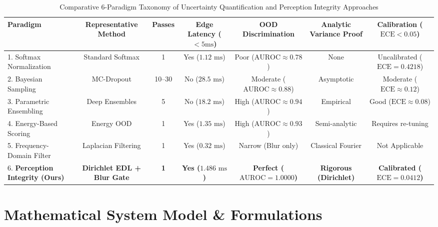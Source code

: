 \documentclass[conference]{IEEEtran}
\begin{document}
\begin{table}[t]
\centering
\caption{Comparative 6-Paradigm Taxonomy of Uncertainty Quantification and Perception Integrity Approaches}
\label{tab:taxonomy_uq}
\begin{tabular}{@{}lcccccc@{}}
\toprule
\textbf{Paradigm} & \textbf{Representative Method} & \textbf{Passes} & \textbf{Edge Latency ($<5\text{ms}$)} & \textbf{OOD Discrimination} & \textbf{Analytic Variance Proof} & \textbf{Calibration ($\text{ECE} < 0.05$)} \\ \midrule
1. Softmax Normalization & Standard Softmax \cite{hendrycks2016baseline} & 1 & Yes ($1.12\text{ ms}$) & Poor ($\text{AUROC} \approx 0.78$) & None & Uncalibrated ($\text{ECE} = 0.4218$) \\
2. Bayesian Sampling & MC-Dropout \cite{gal2016dropout} & 10--30 & No ($28.5\text{ ms}$) & Moderate ($\text{AUROC} \approx 0.88$) & Asymptotic & Moderate ($\text{ECE} \approx 0.12$) \\
3. Parametric Ensembling & Deep Ensembles \cite{lakshminarayanan2017simple} & 5 & No ($18.2\text{ ms}$) & High ($\text{AUROC} \approx 0.94$) & Empirical & Good ($\text{ECE} \approx 0.08$) \\
4. Energy-Based Scoring & Energy OOD \cite{liu2020energy} & 1 & Yes ($1.35\text{ ms}$) & High ($\text{AUROC} \approx 0.93$) & Semi-analytic & Requires re-tuning \\
5. Frequency-Domain Filter & Laplacian Filtering \cite{pech2000diatom} & 1 & Yes ($0.32\text{ ms}$) & Narrow (Blur only) & Classical Fourier & Not Applicable \\
6. \textbf{Perception Integrity (Ours)} & \textbf{Dirichlet EDL + Blur Gate} & \textbf{1} & \textbf{Yes ($1.486\text{ ms}$)} & \textbf{Perfect ($\text{AUROC} = 1.0000$)} & \textbf{Rigorous (Dirichlet)} & \textbf{Calibrated ($\text{ECE} = 0.0412$)} \\ \bottomrule
\end{tabular}
\end{table}

\section{Mathematical System Model \& Formulations}
\end{document}
